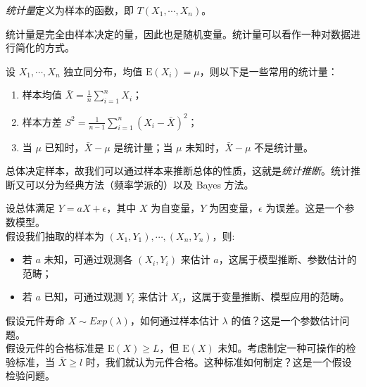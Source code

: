 \documentclass[../main.tex]{subfiles}
\begin{document}
\begin{definition}\label{def:6.0.1}
    \emph{统计量}定义为样本的函数，即 $T(X_1,\cdots,X_n)$。
\end{definition}

统计量是完全由样本决定的量，因此也是随机变量。统计量可以看作一种对数据进行简化的方式。

\begin{example}
    设 $X_1,\cdots,X_n$ 独立同分布，均值 $\mathrm E(X_i)=\mu$，则以下是一些常用的统计量：
    \begin{enumerate}
        \item 样本均值 $\bar X=\frac1n\sum_{i=1}^nX_i$；
        \item 样本方差 $S^2=\frac1{n-1}\sum_{i=1}^n(X_i-\bar X)^2$；
        \item 当 $\mu$ 已知时，$\bar X-\mu$ 是统计量；当 $\mu$ 未知时，$\bar X-\mu$ 不是统计量。
    \end{enumerate}
\end{example}

总体决定样本，故我们可以通过样本来推断总体的性质，这就是\emph{统计推断}。统计推断又可以分为经典方法（频率学派的）以及 Bayes 方法。

\begin{example}
    设总体满足 $Y=aX+\epsilon$，其中 $X$ 为自变量，$Y$ 为因变量，$\epsilon$ 为误差。这是一个参数模型。\\
    假设我们抽取的样本为 $(X_1,Y_1),\cdots,(X_n,Y_n)$，则:
    \begin{itemize}
        \item 若 $a$ 未知，可通过观测各 $(X_i,Y_i)$ 来估计 $a$，这属于模型推断、参数估计的范畴；
        \item 若 $a$ 已知，可通过观测 $Y_i$ 来估计 $X_i$，这属于变量推断、模型应用的范畴。
    \end{itemize}
\end{example}

\begin{example}
    假设元件寿命 $X\sim Exp(\lambda)$，如何通过样本估计 $\lambda$ 的值？这是一个参数估计问题。\\
    假设元件的合格标准是 $\mathrm E(X)\geq L$，但 $\mathrm E(X)$ 未知。考虑制定一种可操作的检验标准，当 $\bar X\geq l$ 时，我们就认为元件合格。这种标准如何制定？这是一个假设检验问题。
\end{example}
\end{document}
